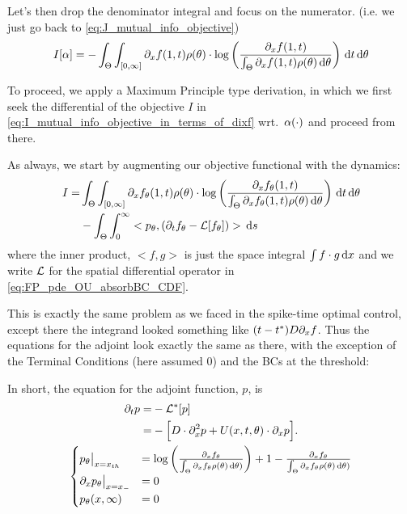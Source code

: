 \documentclass{article}
\begin{document}
Let's then drop the denominator integral and focus on the numerator. (i.e. we
just go back to \cref{eq:J_mutual_info_objective})
\begin{equation}
I[{\alpha}] 
=  -
\int_\Theta \int_{[0, \infty]} {\partial}_xf(1, t)  \rho({\theta}) \cdot 
\log \left( \frac{ {\partial}_xf(1, t)}{\int_\Theta {\partial}_xf(1, t)\rho({\theta}) \, \mathrm{d} {\theta}
} \right)
\, \mathrm{d} t\, \mathrm{d} {\theta}
\label{eq:I_mutual_info_objective_in_terms_of_dixf} 
\end{equation}

To proceed, we apply a Maximum Principle type derivation, in which we first seek
the differential of the objective $I$ in
\cref{eq:I_mutual_info_objective_in_terms_of_dixf} wrt.\
${\alpha}(\cdot)$ and proceed from there.   

As always, we start by augmenting our objective functional with the
dynamics:
\begin{align}
I=&  
\int_\Theta \int_{[0, \infty]} {\partial}_xf_{\theta}(1, t)  \rho({\theta}) \cdot 
\log \left( \frac{{\partial}_xf_{\theta}(1, t)}{\int_\Theta {\partial}_xf_{\theta}(1, t)\rho({\theta})
\, \mathrm{d} {\theta} } \right)
\, \mathrm{d} t\, \mathrm{d} {\theta} 
\\
	  &- \int_\Theta \int_0^\infty <p_{\theta}, ({\partial}_t f_{\theta} - { \mathcal{L} }[f_{\theta}])> \, \mathrm{d} s 
\end{align}
where the inner product, $<f, g>$ is just the space integral $\int f\cdot g
\, \mathrm{d} x$ and we write ${ \mathcal{L} }$ for the spatial differential operator in 
\cref{eq:FP_pde_OU_absorbBC_CDF}.

This is exactly the same problem as we faced in the spike-time optimal control,
except there the integrand looked something like $(t-t^*)D{\partial}_xf$. Thus the
equations for the adjoint look exactly the same as there, with the exception of the Terminal
Conditions (here assumed 0) and the BCs at the threshold:



In short, the equation for the adjoint function, $p$, is
\begin{equation}
\begin{gathered}
\begin{aligned}
{\partial}_t p =& - { { \mathcal{L} }^* }[p]
\\
		=&
			- \Big[ D\cdot {\partial}^2_x p +
			 U(x,t,{\theta})   \cdot {\partial}_x p \Big].
\end{aligned}
\\
\begin{cases}
	p_{\theta} \big|_{x={ x_{th} }} &=  \log\left(\frac{{\partial}_xf_{\theta}}{\int_{\Theta}
	{\partial}_xf_{\theta} \rho({\theta})\, \mathrm{d} {\theta})}\right) +
	 1 -
	  \frac{{\partial}_xf_{\theta}}{\int_{\Theta}
	{\partial}_xf_{\theta} \rho({\theta})\, \mathrm{d} {\theta})}
	\\
	{\partial}_x p_{\theta}  \big|_{x={ x_{-} }} &= 0
	\\
	p_{\theta}(x,\infty) &= 0
\end{cases}
\label{eq:adjoint_pde_OU}
\end{gathered}
\end{equation}
\end{document}
